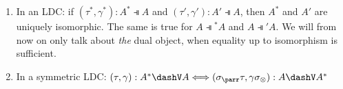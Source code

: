 \documentclass[DIN, pagenumber=false, fontsize=11pt, parskip=half, colorinlistoftodos, svgnames]{scrartcl}
\begin{document}
	\begin{lemma}
		\label{lemma: isoLinDisCat}
		
		\begin{enumerate}
			\item In an LDC: if 
			$(\tau^*, \gamma^*): A^* \dashV A $ and $(\tau', \gamma'): A' \dashV A $, 
			then $A^*$ and $A'$ are uniquely isomorphic. 
			The same is true for 
			$A \dashV {^*A} $ and $A \dashV {'A} $.
			We will from now on only talk about \emph{the} dual object, when equality up to isomorphism is sufficient.
			\item In a symmetric LDC: 
			$(\tau, \gamma): A^* \dashV A 
			\Longleftrightarrow 
			(\sigma_{\parr} \tau , \gamma \sigma_{\otimes} ): A \dashV A^* $ 
		\end{enumerate}
	\end{lemma}
	
\end{document}
